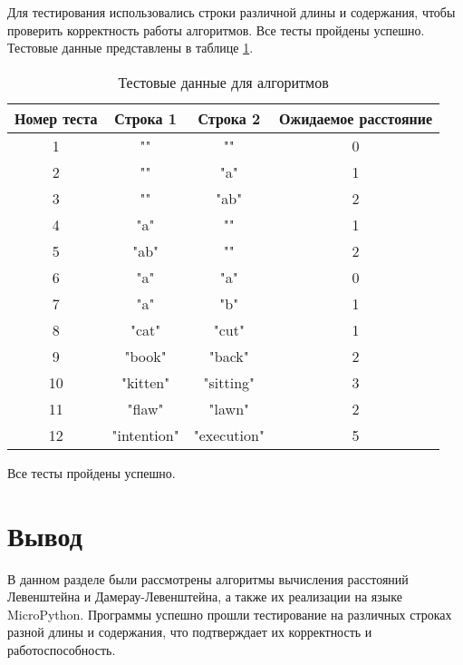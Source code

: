 Для тестирования использовались строки различной длины и содержания, чтобы проверить корректность работы алгоритмов. Все тесты пройдены успешно. Тестовые данные представлены в таблице \ref{tab:test_data}.

\begin{center}
\begin{table}[H]
    \centering
    \caption{Тестовые данные для алгоритмов}
    \label{tab:test_data}
    \begin{tabular}{|c|c|c|c|}
        \hline
        Номер теста & Строка 1 & Строка 2 & Ожидаемое расстояние \\ \hline
        1 & "" & "" & 0 \\ \hline
        2 & "" & "a" & 1 \\ \hline
        3 & "" & "ab" & 2 \\ \hline
        4 & "a" & "" & 1 \\ \hline
        5 & "ab" & "" & 2 \\ \hline
        6 & "a" & "a" & 0 \\ \hline
        7 & "a" & "b" & 1 \\ \hline
        8 & "cat" & "cut" & 1 \\ \hline
        9 & "book" & "back" & 2 \\ \hline
        10 & "kitten" & "sitting" & 3 \\ \hline
        11 & "flaw" & "lawn" & 2 \\ \hline
        12 & "intention" & "execution" & 5 \\ \hline
    \end{tabular}
\end{table}
\end{center}

Все тесты пройдены успешно.

\section*{Вывод}

В данном разделе были рассмотрены алгоритмы вычисления расстояний Левенштейна и Дамерау-Левенштейна, а также их реализации на языке MicroPython. Программы успешно прошли тестирование на различных строках разной длины и содержания, что подтверждает их корректность и работоспособность.
